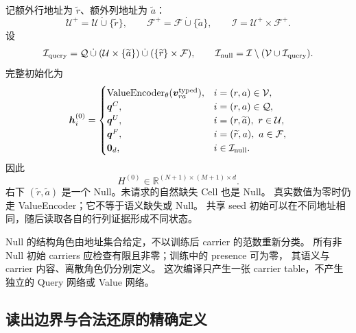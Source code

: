 \documentclass[11pt,UTF8,fontset=fandol]{ctexart}
\numberwithin{equation}{section}
\theoremstyle{definition}
\newcommand{\Rset}{\mathcal U}
\newcommand{\Fset}{\mathcal F}
\newcommand{\Vset}{\mathcal V}
\newcommand{\Qset}{\mathcal Q}
\newcommand{\Iset}{\mathcal I}
\newcommand{\R}{\mathbb R}
\newcommand{\Fstar}{\widetilde r}
\newcommand{\Ustar}{\widetilde a}
\newcommand{\VE}{\operatorname{ValueEncoder}}
\begin{document}
记额外行地址为 $\Fstar$、额外列地址为 $\Ustar$：
\begin{equation}
\Rset^+=\Rset\mathbin{\dot\cup}\{\Fstar\},\qquad
\Fset^+=\Fset\mathbin{\dot\cup}\{\Ustar\},\qquad
\Iset=\Rset^+\times\Fset^+.
\label{eq:E:augmented-addresses}
\end{equation}
设
\[
\Iset_{\rm query}
=\Qset\mathbin{\dot\cup}(\Rset\times\{\Ustar\})
 \mathbin{\dot\cup}(\{\Fstar\}\times\Fset),\qquad
\Iset_{\rm null}=\Iset\setminus(\Vset\cup\Iset_{\rm query}).
\]
完整初始化为
\begin{equation}
\bm h_i^{(0)}=
\begin{cases}
\VE_\theta(\bm v^{\rm typed}_{ra}),&i=(r,a)\in\Vset,\\
\bm q^C,&i=(r,a)\in\Qset,\\
\bm q^U,&i=(r,\Ustar),\ r\in\Rset,\\
\bm q^F,&i=(\Fstar,a),\ a\in\Fset,\\
\bm0_d,&i\in\Iset_{\rm null}.
\end{cases}
\label{eq:E:slot-compiler}
\end{equation}
因此
\begin{equation}
\boxed{H^{(0)}\in\R^{(N+1)\times(M+1)\times d}.}
\label{eq:E:carrier-shape}
\end{equation}
右下 $(\Fstar,\Ustar)$ 是一个 Null。未请求的自然缺失 Cell 也是 Null。
真实数值为零时仍走 ValueEncoder；它不等于语义缺失或 Null。
共享 seed 初始可以在不同地址相同，随后读取各自的行列证据形成不同状态。



Null 的结构角色由地址集合给定，不以训练后 carrier 的范数重新分类。
所有非 Null 初始 carriers 应检查有限且非零；训练中的 presence 可为零，
其语义与 carrier 内容、离散角色仍分别定义。
这次编译只产生一张 carrier table，不产生独立的 Query 网络或 Value 网络。

\subsection{读出边界与合法还原的精确定义}
\label{sec:R:terminal}
\end{document}
